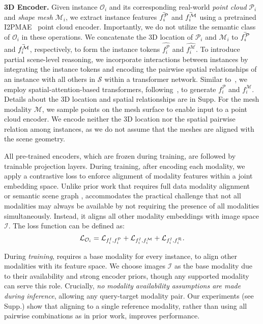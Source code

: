 \noindent \textbf{3D Encoder.} Given instance $\mathcal{O}_i$ and its corresponding real-world \textit{point cloud} $\mathcal{P}_i$ and \textit{shape mesh} $\mathcal{M}_i$, we extract instance features $\Bar{f_i^\mathcal{P}}$ and $\Bar{f_i^\mathcal{M}}$ using a pretrained I2PMAE~\cite{Zhang2022Learning3R} point cloud encoder. Importantly, we do not utilize the semantic class~\cite{jia2024sceneverse, 3dvista} of $\mathcal{O}_i$ in these operations. We concatenate the 3D location of $\mathcal{P}_i$ and $\mathcal{M}_i$ to $\Bar{f_i^\mathcal{P}}$ and $\Bar{f_i^\mathcal{M}}$, respectively, to form the instance tokens $\hat{f_i^\mathcal{P}}$ and $\hat{f_i^\mathcal{M}}$. To introduce partial scene-level reasoning, we incorporate interactions between instances by integrating the instance tokens and encoding the pairwise spatial relationships of an instance with all others in $\mathcal{S}$ within a transformer network. Similar to~\cite{jia2024sceneverse}, we employ spatial-attention-based transformers, following~\cite{3dvista, chenlanguage2022}, to generate $f_i^\mathcal{P}$ and $f_i^\mathcal{M}$. Details about the 3D location and spatial relationships are in Supp. For the mesh modality $\mathcal{M}$, we sample points on the mesh surface to enable input to a point cloud encoder. We encode neither the 3D location nor the spatial pairwise relation among instances, as we do not assume that the meshes are aligned with the scene geometry.

All pre-trained encoders, which are frozen during training, are followed by trainable projection layers. During training, after encoding each modality, we apply a contrastive loss to enforce alignment of modality features within a joint embedding space. Unlike prior work that requires full data modality alignment~\cite{pointbind, xue2023ulip2} or semantic scene graph \cite{sarkar2023sgaligner,miao2024scenegraphloc}, \project{} accommodates the practical challenge that not all modalities may always be available by not requiring the presence of all modalities simultaneously. Instead, it aligns all other modality embeddings with image space $\mathcal{I}$. The loss function can be defined as:
%
\begin{equation}
\vspace{-2pt} 
    \mathcal{L}_{\mathcal{O}_i} = \mathcal{L}_{f_i^I, f_i^\mathcal{P}} + \mathcal{L}_{f_i^I, f_i^\mathcal{M}} + \mathcal{L}_{f_i^I, f_i^\mathcal{R}}.
\end{equation}

 During \textit{training}, \project{} requires a base modality for every instance, to align other modalities with its feature space. We choose images $\mathcal{I}$ as the base modality due to their availability and strong encoder priors, though any supported modality can serve this role. Crucially, \textit{no modality availability assumptions are made during inference}, allowing any query-target modality pair. Our experiments (see Supp.) show that aligning to a single reference modality, rather than using all pairwise combinations as in prior work, improves performance.


